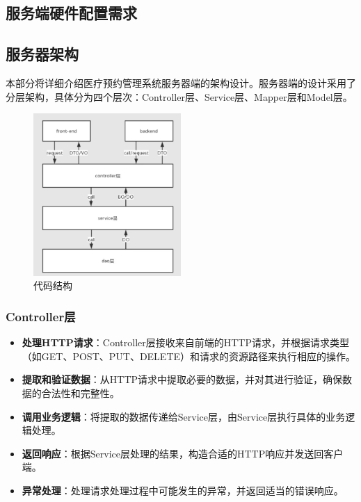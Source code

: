 \subsection{服务端硬件配置需求}
\subsection{服务器架构}
本部分将详细介绍医疗预约管理系统服务器端的架构设计。服务器端的设计采用了分层架构，具体分为四个层次：Controller层、Service层、Mapper层和Model层。

\begin{figure}[htbp]
	\centering
	\includegraphics[width=0.5\textwidth]{figures/31.png}
	\caption{代码结构}
\end{figure}

\subsubsection{Controller层}
\begin{itemize}
	\item \textbf{处理HTTP请求}：Controller层接收来自前端的HTTP请求，并根据请求类型（如GET、POST、PUT、DELETE）和请求的资源路径来执行相应的操作。
	
	\item \textbf{提取和验证数据}：从HTTP请求中提取必要的数据，并对其进行验证，确保数据的合法性和完整性。
	
	\item \textbf{调用业务逻辑}：将提取的数据传递给Service层，由Service层执行具体的业务逻辑处理。
	
	\item \textbf{返回响应}：根据Service层处理的结果，构造合适的HTTP响应并发送回客户端。
	
	\item \textbf{异常处理}：处理请求处理过程中可能发生的异常，并返回适当的错误响应。
\end{itemize}

